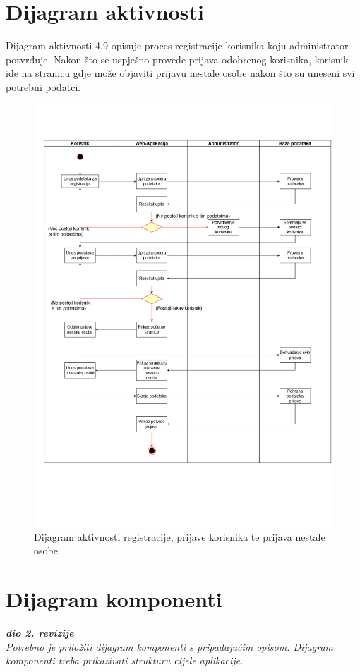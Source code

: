 			
			\eject 
		
		\section{Dijagram aktivnosti}


                Dijagram aktivnosti 4.9 opisuje proces registracije korisnika koju administrator potvrđuje. Nakon što se uspješno provede prijava odobrenog korisnika, korisnik ide na stranicu gdje može objaviti prijavu nestale osobe nakon što su uneseni svi potrebni podatci.
            
            \begin{figure}[H]
			         \includegraphics[scale=0.37]{dijagrami/DijagramAktivnosti.png} %
			         \centering
			         \caption{Dijagram aktivnosti registracije, prijave korisnika te prijava nestale osobe}
			         \label{fig:promjene}
		      \end{figure}
			
			\eject
		\section{Dijagram komponenti}
		
			\textbf{\textit{dio 2. revizije}}\\
		
			 \textit{Potrebno je priložiti dijagram komponenti s pripadajućim opisom. Dijagram komponenti treba prikazivati strukturu cijele aplikacije.}

